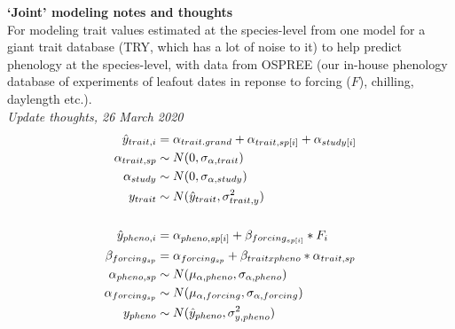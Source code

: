 \documentclass[11pt,letter]{article}
\begin{document}

\renewcommand{\refname}{\CHead{}}

{\bf `Joint' modeling notes and thoughts}\\

For modeling trait values estimated at the species-level from one model for a giant trait database (TRY, which has a lot of noise to it) to help predict phenology at the species-level, with data from OSPREE (our in-house phenology database of experiments of leafout dates in reponse to forcing ($F$), chilling, daylength etc.).\\

\emph{Update thoughts, 26 March 2020}\\

\begin{align*}
\hat{y}_{trait, i} &= \alpha_{trait.grand} + \alpha_{trait, sp[i]} + \alpha_{study[i]}\\
\alpha_{trait, sp} & \sim N(0, \sigma_{\alpha, trait}) \\
\alpha_{study}  & \sim N(0, \sigma_{\alpha, study})\\
y_{trait}& \sim N(\hat{y}_{trait},\sigma^2_{trait, y}) \\
\vspace{1ex}\\
\hat{y}_{pheno, i} &= \alpha_{pheno, sp[i]} + \beta_{forcing_{sp[i]}}*F_i \\
\beta_{forcing_{sp}} & = \alpha_{forcing_{sp}} + \beta_{trait x pheno}*\alpha_{trait, sp} \\
\alpha_{pheno, sp} & \sim N(\mu_{\alpha, pheno}, \sigma_{\alpha, pheno}) \\
\alpha_{forcing_{sp}} & \sim N(\mu_{\alpha, forcing}, \sigma_{\alpha, forcing})\\
y_{pheno} & \sim N(\hat{y}_{pheno},\sigma^2_{y, pheno}) 
\end{align*}
\end{document}
